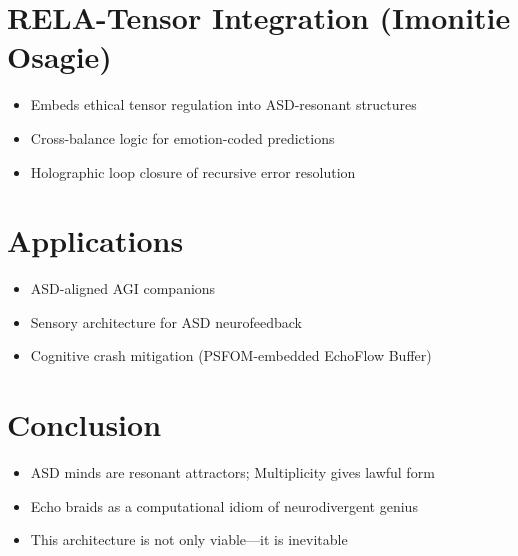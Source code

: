 \documentclass[12pt]{article}
\theoremstyle{plain}
\begin{document}
\section{RELA-Tensor Integration (Imonitie Osagie)}
\begin{itemize}
  \item Embeds ethical tensor regulation into ASD-resonant structures
  \item Cross-balance logic for emotion-coded predictions
  \item Holographic loop closure of recursive error resolution
\end{itemize}

\section{Applications}
\begin{itemize}
  \item ASD-aligned AGI companions
  \item Sensory architecture for ASD neurofeedback
  \item Cognitive crash mitigation (PSFOM-embedded EchoFlow Buffer)
\end{itemize}

\section{Conclusion}
\begin{itemize}
  \item ASD minds are resonant attractors; Multiplicity gives lawful form
  \item Echo braids as a computational idiom of neurodivergent genius
  \item This architecture is not only viable---it is inevitable
\end{itemize}

\nocite{*}
\printbibliography
\end{document}
